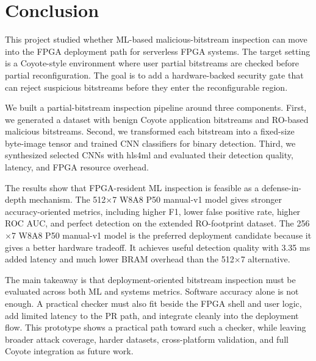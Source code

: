\chapter{Conclusion}
\label{ch:conclusion}

This project studied whether ML-based malicious-bitstream inspection can move into the FPGA deployment path for serverless FPGA systems. The target setting is a Coyote-style environment where user partial bitstreams are checked before partial reconfiguration. The goal is to add a hardware-backed security gate that can reject suspicious bitstreams before they enter the reconfigurable region.

We built a partial-bitstream inspection pipeline around three components. First, we generated a dataset with benign Coyote application bitstreams and RO-based malicious bitstreams. Second, we transformed each bitstream into a fixed-size byte-image tensor and trained CNN classifiers for binary detection. Third, we synthesized selected CNNs with hls4ml and evaluated their detection quality, latency, and FPGA resource overhead.

The results show that FPGA-resident ML inspection is feasible as a defense-in-depth mechanism. The 512$\times$7 W8A8 P50 manual-v1 model gives stronger accuracy-oriented metrics, including higher F1, lower false positive rate, higher ROC AUC, and perfect detection on the extended RO-footprint dataset. The 256$\times$7 W8A8 P50 manual-v1 model is the preferred deployment candidate because it gives a better hardware tradeoff. It achieves useful detection quality with 3.35 ms added latency and much lower BRAM overhead than the 512$\times$7 alternative.

The main takeaway is that deployment-oriented bitstream inspection must be evaluated across both ML and systems metrics. Software accuracy alone is not enough. A practical checker must also fit beside the FPGA shell and user logic, add limited latency to the PR path, and integrate cleanly into the deployment flow. This prototype shows a practical path toward such a checker, while leaving broader attack coverage, harder datasets, cross-platform validation, and full Coyote integration as future work.

